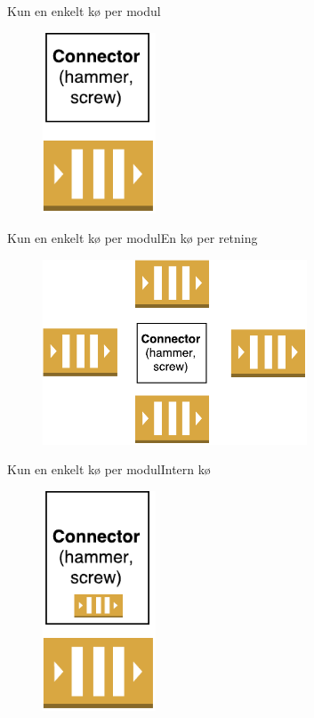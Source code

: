 \begin{frame}{Kun en enkelt kø per modul}{}
  \begin{figure}
    \centering
    \includegraphics[width=0.3\textwidth]{figures/1Queue.pdf}
  \end{figure}
\end{frame}

\begin{frame}{Kun en enkelt kø per modul}{En kø per retning}
  \begin{figure}
    \centering
    \includegraphics[width=0.7\textwidth]{figures/4Queues.pdf}
  \end{figure}
\end{frame}

\begin{frame}{Kun en enkelt kø per modul}{Intern kø}
  \begin{figure}
    \centering
    \includegraphics[width=0.3\textwidth]{figures/internalQueue.pdf}
  \end{figure}
\end{frame}

